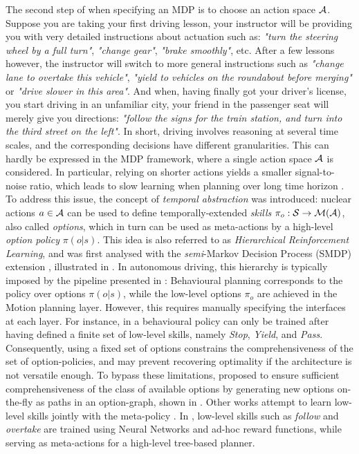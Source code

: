 The second step of when specifying an MDP is to choose an action space $\mathcal{A}$. Suppose you are taking your first driving lesson, your instructor will be providing you with very detailed instructions about actuation such as: \emph{"turn the steering wheel by a full turn"}, \emph{"change gear"}, \emph{"brake smoothly"}, etc. After a few lessons however, the instructor will switch to more general instructions such as \emph{"change lane to overtake this vehicle"}, \emph{"yield to vehicles on the roundabout before merging"} or \emph{"drive slower in this area"}. And when, having finally got your driver's license, you start driving in an unfamiliar city, your friend in the passenger seat will merely give you directions: \emph{"follow the signs for the train station, and turn into the third street on the left"}. In short, driving involves reasoning at several time scales, and the corresponding decisions have different granularities. This can hardly be expressed in the MDP framework, where a single action space $\mathcal{A}$ is considered. In particular, relying on shorter actions yields a smaller signal-to-noise ratio, which leads to slow learning when planning over long time horizon \citep{ShalevShwartz2017}. To address this issue, the concept of \emph{temporal abstraction} was introduced: nuclear actions $a\in\mathcal{A}$ can be used to define temporally-extended \emph{skills} $\pi_o:\mathcal{S} \rightarrow \mathcal{M}(\mathcal{A})$, also called \emph{options}, which in turn can be used as meta-actions by a high-level \emph{option policy} $\pi(o|s)$. This idea is also referred to as \emph{Hierarchical Reinforcement Learning}, and was first analysed with the \emph{semi}-Markov Decision Process (SMDP) extension \citep{Sutton1999}, illustrated in . In autonomous driving, this hierarchy is typically imposed by the pipeline presented in : Behavioural planning corresponds to the policy over options $\pi(o|s)$, while the low-level options $\pi_o$ are achieved in the Motion planning layer. However, this requires manually specifying the interfaces at each layer. For instance, in \citep{Barbier2018} a behavioural policy can only be trained after having defined a finite set of low-level skills, namely \emph{Stop}, \emph{Yield}, and \emph{Pass}. Consequently, using a fixed set of options constrains the comprehensiveness of the set of option-policies, and may prevent recovering optimality if the architecture is not versatile enough. To bypass these limitations, \citet{ShalevShwartz2016} proposed to ensure sufficient comprehensiveness of the class of available options by generating new options on-the-fly as paths in an option-graph, shown in . Other works attempt to learn low-level skills jointly with the meta-policy \citep{Bacon2017,Vezhnevets2017,Heess2016}. In \citep{Paxton2017}, low-level skills such as \emph{follow} and \emph{overtake} are trained using Neural Networks and ad-hoc reward functions, while serving as meta-actions for a high-level tree-based planner.

